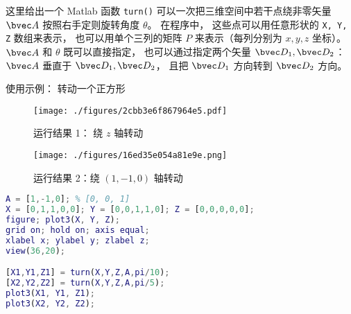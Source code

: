 

这里给出一个 Matlab 函数 \verb|turn()| 可以一次把三维空间中若干点绕非零矢量 $\bvec A$ 按照右手定则旋转角度 $\theta$。 在程序中， 这些点可以用任意形状的 \verb|X, Y, Z| 数组来表示， 也可以用单个三列的矩阵 $P$ 来表示（每列分别为 $x, y, z$ 坐标）。 $\bvec A$ 和 $\theta$ 既可以直接指定， 也可以通过指定两个矢量 $\bvec D_1, \bvec D_2$： $\bvec A$ 垂直于 $\bvec D_1, \bvec D_2$， 且把 $\bvec D_1$ 方向转到 $\bvec D_2$ 方向。

使用示例： 转动一个正方形
\begin{figure}[ht]
\centering
\texttt{[image: ./figures/2cbb3e6f867964e5.pdf]}
\caption{运行结果 1： 绕 $z$ 轴转动} \label{fig_turnM_1}
\end{figure}
\begin{figure}[ht]
\centering
\texttt{[image: ./figures/16ed35e054a81e9e.png]}
\caption{运行结果 2：绕 $(1,-1,0)$ 轴转动} \label{fig_turnM_2}
\end{figure}

\begin{lstlisting}[language=matlab, caption=turn\_demo.m]
% turn_demo
A = [1,-1,0]; % [0, 0, 1]
X = [0,1,1,0,0]; Y = [0,0,1,1,0]; Z = [0,0,0,0,0];
figure; plot3(X, Y, Z);
grid on; hold on; axis equal;
xlabel x; ylabel y; zlabel z;
view(36,20);

[X1,Y1,Z1] = turn(X,Y,Z,A,pi/10);
[X2,Y2,Z2] = turn(X,Y,Z,A,pi/5);
plot3(X1, Y1, Z1);
plot3(X2, Y2, Z2);
\end{lstlisting}

